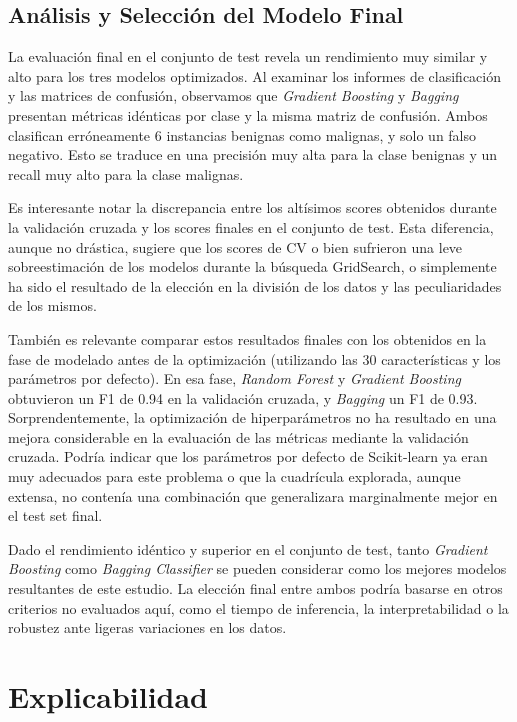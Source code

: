 \documentclass[a4paper,12pt]{article}
\begin{document}
\subsection{Análisis y Selección del Modelo Final}

La evaluación final en el conjunto de test revela un rendimiento muy similar y alto para los tres modelos optimizados. Al examinar los informes de clasificación y las matrices de confusión, observamos que \textit{Gradient Boosting} y \textit{Bagging} presentan métricas idénticas por clase y la misma matriz de confusión. Ambos clasifican erróneamente 6 instancias benignas como malignas, y solo un falso negativo. Esto se traduce en una precisión muy alta para la clase benignas y un recall muy alto para la clase malignas.

Es interesante notar la discrepancia entre los altísimos scores obtenidos durante la validación cruzada y los scores finales en el conjunto de test. Esta diferencia, aunque no drástica, sugiere que los scores de CV o bien sufrieron una leve sobreestimación de los modelos durante la búsqueda GridSearch, o simplemente ha sido el resultado de la elección en la división de los datos y las peculiaridades de los mismos.

También es relevante comparar estos resultados finales con los obtenidos en la fase de modelado antes de la optimización (utilizando las 30 características y los parámetros por defecto). En esa fase, \textit{Random Forest} y \textit{Gradient Boosting} obtuvieron un F1 de 0.94 en la validación cruzada, y \textit{Bagging} un F1 de 0.93. Sorprendentemente, la optimización de hiperparámetros no ha resultado en una mejora considerable en la evaluación de las métricas mediante la validación cruzada. Podría indicar que los parámetros por defecto de Scikit-learn ya eran muy adecuados para este problema o que la cuadrícula explorada, aunque extensa, no contenía una combinación que generalizara marginalmente mejor en el test set final.

Dado el rendimiento idéntico y superior en el conjunto de test, tanto \textit{Gradient Boosting} como \textit{Bagging Classifier} se pueden considerar como los mejores modelos resultantes de este estudio. La elección final entre ambos podría basarse en otros criterios no evaluados aquí, como el tiempo de inferencia, la interpretabilidad o la robustez ante ligeras variaciones en los datos.


\newpage
\section{Explicabilidad}
\end{document}
